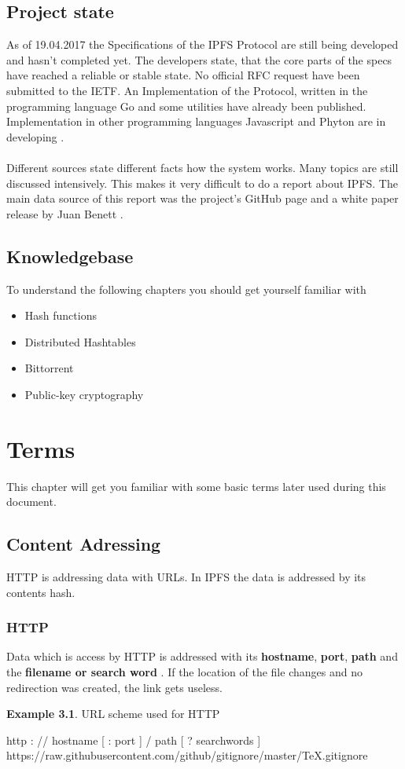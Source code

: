 \documentclass[a4paper,11pt, oneside]{report}
\theoremstyle{definition}
\newtheorem{exmp}{Example}[subsection]
\begin{document}
\section{Project state}
As of 19.04.2017 the Specifications of the IPFS Protocol are still being developed and hasn't completed yet. The developers state, that the core parts of the specs have reached a reliable or stable state. No official RFC request have been submitted to the IETF. An Implementation of the Protocol, written in the programming language Go and some utilities have already been published. Implementation in other programming languages Javascript and Phyton are in developing \cite{specs}.\\ \\
Different sources state different facts how the system works. Many topics are still discussed intensively. This makes it very difficult to do a report about IPFS. The main data source of this report was the project's GitHub page and a white paper release by Juan Benett \cite{Whitepaper}.

\section{Knowledgebase}
To understand the following chapters you should get yourself familiar with
\begin{itemize}
\item Hash functions
\item Distributed Hashtables
\item Bittorrent
\item Public-key cryptography 
\end{itemize}

\newpage
 

\chapter{Terms}
This chapter will get you familiar with some basic terms later used during this document.
\section{Content Adressing}
HTTP is addressing data with URLs. In IPFS the data is addressed by its contents hash.
\subsection{HTTP}
Data which is access by HTTP is addressed with its \textbf{hostname}, \textbf{port}, \textbf{path} and the \textbf{filename or search word} \cite{HTTPAdressing}. If the location of the file changes and no redirection was created, the link gets useless.
\begin{exmp} URL scheme used for HTTP
\noindent
\begin{center}
http : // hostname [ : port ] / path [ ? searchwords ]\\
https://raw.githubusercontent.com/github/gitignore/master/TeX.gitignore
\end{center}
\end{exmp}
\end{document}
